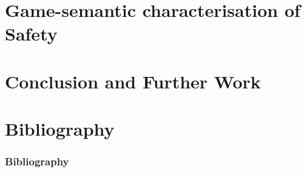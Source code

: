 
\section{Game-semantic characterisation of Safety}


\section{Conclusion and Further Work}

\section{Bibliography}
\begin{frame} \frametitle<presentation>{Bibliography}

\end{frame}


